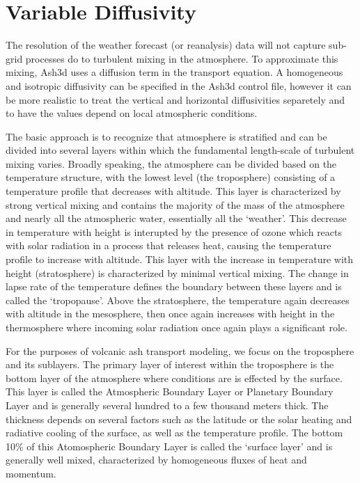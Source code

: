\chapter{Variable Diffusivity}\label{ChapAppendVarDiff}
The resolution of the weather forecast (or reanalysis) data will not capture sub-grid
processes do to turbulent mixing in the atmosphere. To approximate this mixing, Ash3d
uses a diffusion term in the transport equation. A homogeneous and isotropic diffusivity
can be specified in the Ash3d control file, however it can be more realistic to 
treat the vertical and horizontal diffusivities separetely and to have the values
depend on local atmospheric conditions.

The basic approach is to recognize that atmosphere is stratified and can be divided into
several layers within which the fundamental length-scale of turbulent mixing varies.
Broadly speaking, the atmosphere can be divided based on the temperature structure,
with the lowest level (the troposphere) consisting of a temperature profile that
decreases with altitude. This layer is characterized by strong vertical mixing and
contains the majority of the mass of the atmosphere and nearly all the atmospheric
water, essentially all the `weather'. This decrease in temperature with height is
interupted by the presence of ozone which reacts with solar radiation in a process that
releases heat, causing the temperature profile to increase with altitude. This layer
with the increase in temperature with height (stratosphere) is characterized by
minimal vertical mixing.
The change in lapse rate of the temperature defines the boundary between these layers
and is called the `tropopause'. Above the stratosphere, the temperature again decreases with
altitude in the mesosphere, then once again increases with height in the thermosphere
where incoming solar radiation once again plays a significant role.

For the purposes of volcanic ash transport modeling, we focus on the troposphere and
its sublayers. The primary layer of interest within the troposphere is the bottom layer
of the atmosphere where conditions are 
is effected by the surface. This layer is called the Atmospheric Boundary Layer or
Planetary Boundary Layer and is generally several hundred to a few thousand meters thick.
The thickness depends on several factors such as the latitude or the solar heating and
radiative cooling of the surface, as well as the temperature profile.
The bottom 10\% of this Atomospheric Boundary Layer is called the `surface layer' and 
is generally well mixed, characterized by homogeneous fluxes of heat and momentum.

